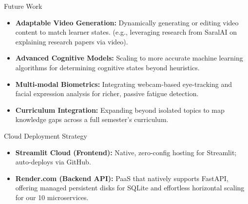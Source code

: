 \documentclass[aspectratio=169]{beamer}
\begin{document}
\begin{frame}{Future Work}
    \begin{itemize}
        \item \textbf{Adaptable Video Generation:} Dynamically generating or editing video content to match learner states. (e.g., leveraging research from SaralAI on explaining research papers via video).
        \item \textbf{Advanced Cognitive Models:} Scaling to more accurate machine learning algorithms for determining cognitive states beyond heuristics.
        \item \textbf{Multi-modal Biometrics:} Integrating webcam-based eye-tracking and facial expression analysis for richer, passive fatigue detection.
        \item \textbf{Curriculum Integration:} Expanding beyond isolated topics to map knowledge gaps across a full semester's curriculum.
    \end{itemize}
\end{frame}

\begin{frame}{Cloud Deployment Strategy}
    \begin{itemize}
        \item \textbf{Streamlit Cloud (Frontend):} Native, zero-config hosting for Streamlit; auto-deploys via GitHub.
        \item \textbf{Render.com (Backend API):} PaaS that natively supports FastAPI, offering managed persistent disks for SQLite and effortless horizontal scaling for our 10 microservices.
    \end{itemize}
    \vspace{0.4cm}
    \begin{center}
    \end{center}
\end{frame}
\end{document}
